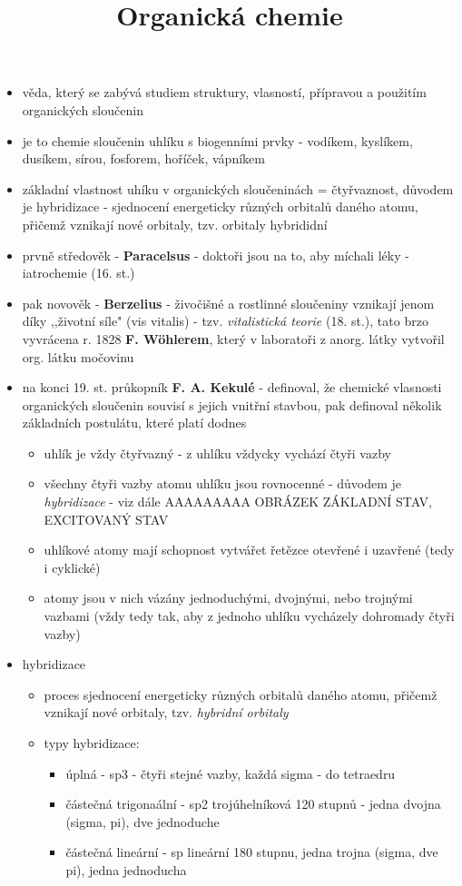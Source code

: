 \documentclass{article}
\title{\vspace{-2cm}Organická chemie\vspace{-1.7cm}}
\date{}
\author{}
\begin{document}
\maketitle

\begin{itemize}
  \item věda, který se zabývá studiem struktury, vlasností, přípravou a použitím organických sloučenin
  \item je to chemie sloučenin uhlíku s biogenními prvky - vodíkem, kyslíkem, dusíkem, sírou, fosforem, hoříček, vápníkem
  \item základní vlastnost uhíku v organických sloučeninách = čtyřvaznost, důvodem je hybridizace - sjednocení energeticky různých orbitalů daného atomu, přičemž vznikají nové orbitaly, tzv. orbitaly hybrididní
  \item prvně středověk - \textbf{Paracelsus} - doktoři jsou na to, aby míchali léky - iatrochemie (16. st.)
  \item pak novověk - \textbf{Berzelius} - živočišné a rostlinné sloučeniny vznikají jenom díky ,,životní síle" (vis vitalis) - tzv. \textit{vitalistická teorie} (18. st.), tato brzo vyvrácena r. 1828 \textbf{F. Wöhlerem}, který v laboratoři z anorg. látky vytvořil org. látku močovinu
  \item na konci 19. st. průkopník \textbf{F. A. Kekulé} - definoval, že chemické vlasnosti organických sloučenin souvisí s jejich vnitřní stavbou, pak definoval několik základních postulátu, které platí dodnes
  \begin{itemize}
    \item uhlík je vždy čtyřvazný - z uhlíku vždycky vychází čtyři vazby
    \item všechny čtyři vazby atomu uhlíku jsou rovnocenné - důvodem je \textit{hybridizace} - viz dále
    AAAAAAAAA OBRÁZEK ZÁKLADNÍ STAV, EXCITOVANÝ STAV
    \item uhlíkové atomy mají schopnost vytvářet řetězce otevřené i uzavřené (tedy i cyklické)
    \item atomy jsou v nich vázány jednoduchými, dvojnými, nebo trojnými vazbami (vždy tedy tak, aby z jednoho uhlíku vycházely dohromady čtyři vazby)
  \end{itemize}
  \item hybridizace
  \begin{itemize}
    \item proces sjednocení energeticky různých orbitalů daného atomu, přičemž vznikají nové orbitaly, tzv. \textit{hybridní orbitaly}
    \item typy hybridizace:
    \begin{itemize}
      \item úplná - sp3 - čtyři stejné vazby, každá sigma - do tetraedru
      \item částečná trigonaální - sp2 trojúhelníková 120 stupnů - jedna dvojna (sigma, pi), dve jednoduche
      \item částečná lineární - sp lineární 180 stupnu, jedna trojna (sigma, dve pi), jedna jednoducha
    \end{itemize}


\end{itemize}
\end{itemize}
\end{document}
